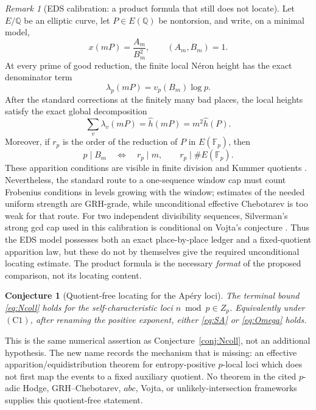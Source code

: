 \documentclass[11pt]{amsart}
\theoremstyle{plain}
\newtheorem{conjecture}{Conjecture}
\theoremstyle{remark}
\newtheorem{remark}{Remark}
\begin{document}
\begin{remark}[EDS calibration: a product formula that still does not locate]
\label{rem:EDS-calibration}
Let $E/\mathbb Q$ be an elliptic curve, let $P\in E(\mathbb Q)$ be
nontorsion, and write, on a minimal model,
\[
 x(mP)=\frac{A_m}{B_m^2},\qquad (A_m,B_m)=1.
\]
At every prime of good reduction, the finite local N\'eron height has
the exact denominator term
\[
 \lambda_p(mP)=v_p(B_m)\log p.
\]
After the standard corrections at the finitely many bad places, the
local heights satisfy the exact global decomposition
\[
 \sum_v\lambda_v(mP)=\widehat h(mP)=m^2\widehat h(P).
 \tag{8.19}\label{eq:EDS-height}
\]
Moreover, if $r_p$ is the order of the reduction of $P$ in
$E(\mathbb F_p)$, then
\[
 p\mid B_m\quad\Longleftrightarrow\quad r_p\mid m,
 \qquad r_p\mid\#E(\mathbb F_p).
\]
These apparition conditions are visible in finite division and Kummer
quotients \cite{SilvermanEDS2005}.  Nevertheless, the standard route
to a one-sequence window cap must count Frobenius conditions in levels
growing with the window; estimates of the needed uniform strength are
GRH-grade, while unconditional effective Chebotarev is too weak for
that route.  For two independent divisibility sequences, Silverman's
strong gcd cap used in this calibration is conditional on Vojta's
conjecture \cite{Silverman2005}.  Thus the EDS model possesses both an exact
place-by-place ledger and a fixed-quotient apparition law, but these do
not by themselves give the required unconditional locating estimate.
The product formula is the necessary \emph{format} of the proposed
comparison, not its locating content.
\end{remark}

\begin{conjecture}[Quotient-free locating for the Ap\'ery loci]
\label{conj:quotient-free-locating}
The terminal bound \eqref{eq:Ncoll} holds for the self-characteristic
loci $n\bmod p\in Z_p$.  Equivalently under $(\mathrm C1)$, after
renaming the positive exponent, either \eqref{eq:SA} or
\eqref{eq:Omega} holds.
\end{conjecture}

This is the same numerical assertion as
Conjecture~\ref{conj:Ncoll}, not an additional hypothesis.  The new
name records the mechanism that is missing: an effective
apparition/equidistribution theorem for entropy-positive $p$-local
loci which does not first map the events to a fixed auxiliary
quotient.  No theorem in the cited $p$-adic Hodge, GRH--Chebotarev,
$abc$, Vojta, or unlikely-intersection frameworks supplies this
quotient-free statement.
\end{document}
